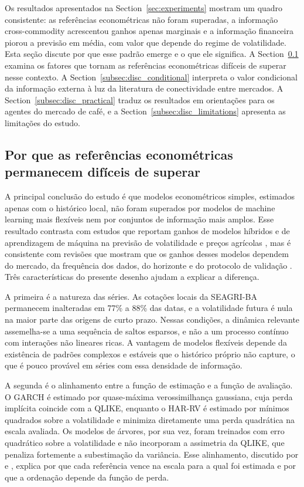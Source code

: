 \documentclass[a4paper,fleqn]{cas-sc}
\begin{document}
Os resultados apresentados na Section~\ref{sec:experiments} mostram um quadro consistente: as referências econométricas não foram superadas, a informação cross-commodity acrescentou ganhos apenas marginais e a informação financeira piorou a previsão em média, com valor que depende do regime de volatilidade. Esta seção discute por que esse padrão emerge e o que ele significa. A Section~\ref{subsec:disc_benchmarks} examina os fatores que tornam as referências econométricas difíceis de superar nesse contexto. A Section~\ref{subsec:disc_conditional} interpreta o valor condicional da informação externa à luz da literatura de conectividade entre mercados. A Section~\ref{subsec:disc_practical} traduz os resultados em orientações para os agentes do mercado de café, e a Section~\ref{subsec:disc_limitations} apresenta as limitações do estudo.

\subsection{Por que as referências econométricas permanecem difíceis de superar}
\label{subsec:disc_benchmarks}

A principal conclusão do estudo é que modelos econométricos simples, estimados apenas com o histórico local, não foram superados por modelos de machine learning mais flexíveis nem por conjuntos de informação mais amplos. Esse resultado contrasta com estudos que reportam ganhos de modelos híbridos e de aprendizagem de máquina na previsão de volatilidade e preços agrícolas \citep{Manogna2025HybridVolatility,Zhang2025ClimateRealizedVolatility,Jin2024CoffeePriceML}, mas é consistente com revisões que mostram que os ganhos desses modelos dependem do mercado, da frequência dos dados, do horizonte e do protocolo de validação \citep{Guindani2024AgriculturalForecasting}. Três características do presente desenho ajudam a explicar a diferença.

A primeira é a natureza das séries. As cotações locais da SEAGRI-BA permanecem inalteradas em 77\% a 88\% das datas, e a volatilidade futura é nula na maior parte das origens de curto prazo. Nessas condições, a dinâmica relevante assemelha-se a uma sequência de saltos esparsos, e não a um processo contínuo com interações não lineares ricas. A vantagem de modelos flexíveis depende da existência de padrões complexos e estáveis que o histórico próprio não capture, o que é pouco provável em séries com essa densidade de informação.

A segunda é o alinhamento entre a função de estimação e a função de avaliação. O GARCH é estimado por quase-máxima verossimilhança gaussiana, cuja perda implícita coincide com a QLIKE, enquanto o HAR-RV é estimado por mínimos quadrados sobre a volatilidade e minimiza diretamente uma perda quadrática na escala avaliada. Os modelos de árvores, por sua vez, foram treinados com erro quadrático sobre a volatilidade e não incorporam a assimetria da QLIKE, que penaliza fortemente a subestimação da variância. Esse alinhamento, discutido por \citet{Patton2011VolatilityProxy} e \citet{HansenLunde2006ConsistentRanking}, explica por que cada referência vence na escala para a qual foi estimada e por que a ordenação depende da função de perda.
\end{document}
